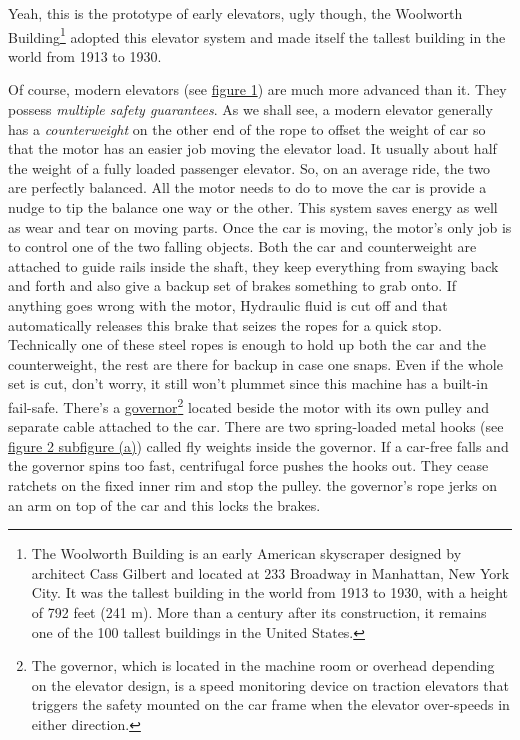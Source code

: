  	Yeah, this is the prototype of early elevators, ugly though, the Woolworth 
 	Building\footnote{The Woolworth Building is an early American 
 	skyscraper designed by architect Cass Gilbert and located at 233 Broadway 
 	in Manhattan, New York City. It was the tallest building in the world from 
 	1913 to 1930, with a height of 792 feet (241 m). More than a century after 
 	its construction, it remains one of the 100 tallest buildings in the 
 	United States.} adopted this elevator system and made itself the tallest 
 	building in the world from 1913 to 1930. 
	
	Of course, modern elevators (see
	 \hyperref[fig:safetygaurantees]{figure 1}) 
	are much more advanced than it. They possess 
	\emph{multiple safety guarantees}. As we shall 
	see, a modern elevator generally has a 
	\emph{counterweight} on the other end of 
	the rope to offset the weight of car so that
	the motor has an easier job moving the elevator
	load. It usually about half the weight 
	of a fully loaded passenger elevator. So, 
	on an average ride, the two are 
	perfectly balanced. All the motor needs 
	to do to move the car is provide a 
	nudge to tip the balance one way or 
	the other. This system saves energy as 
	well as wear and tear on moving parts.
	Once the car is moving, the motor's 
	only job is to control
	one of the two falling objects.
	Both the car and counterweight are
	attached to guide rails inside the shaft,
	they keep everything from swaying back
	and forth and also give a backup set of
	brakes something to grab onto. If
	anything goes wrong with the motor,
	Hydraulic fluid is cut off and that
	automatically releases this brake that
	seizes the ropes for a quick stop.
	Technically one of these steel ropes is
	enough to hold up both the car and the
	counterweight, the rest are there for
	backup in case one snaps. Even if the
	whole set is cut, don't worry, it still
	won't plummet since this machine has a
	built-in fail-safe. There's a 
			\hyperref[governor]{governor\footnote{
			The governor, which is located in the machine room or 
			overhead depending on the elevator design, is a speed monitoring 
			device on traction elevators that triggers the safety mounted on 
			the car frame when the elevator over-speeds in either direction.}} 
	located beside the motor with its own
	pulley and separate cable attached to
	the car. There are two spring-loaded
	metal hooks (see \hyperref[governor]{
	figure 2 subfigure (a)}) called
	fly weights inside the governor. If a
	car-free falls and the governor spins
	too fast, centrifugal force pushes the
	hooks out. They cease ratchets on the
	fixed inner rim and stop the pulley. the
	governor's rope jerks on an arm on top
	of the car and this locks the brakes.
	
